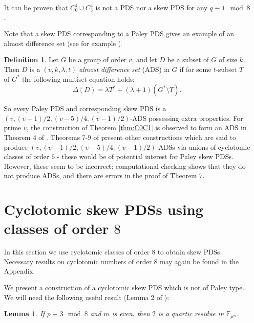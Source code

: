 \documentclass[12pt, a4paper]{article}
\newtheorem{lemma}[theorem]{Lemma}
\theoremstyle{definition}
\newtheorem{definition}[theorem]{Definition}
\begin{document}
It can be proven that $C_0^4 \cup C_3^4$ is not a PDS nor a skew PDS for any $q \equiv 1 \mod 8$.

Note that a skew PDS corresponding to a Paley PDS gives an example of an almost difference set (see for example \cite{Ara}).
\begin{definition}
Let $G$ be a group of order $v$, and let $D$ be a subset of $G$ of size $k$. Then $D$ is a $(v,k,\lambda,t)$ \emph{almost difference set} (ADS) in $G$ if for some $t$-subset $T$ of $G^*$ the following multiset equation holds:
$$\Delta(D)=\lambda T^* + (\lambda+1) (G^* \setminus T).$$
\end{definition}

So every Paley PDS and corresponding skew PDS is a $(v,(v-1)/2, (v-5)/4,(v-1)/2)$-ADS possessing extra properties.  For prime $v$, the construction of Theorem \ref{thm:C0C1} is observed to form an ADS in Theorem 4 of \cite{DinHelLam}.  Theorems 7-9 of \cite{DinHelLam} present other constructions which are said to produce $(v,(v-1)/2, (v-5)/4,(v-1)/2)$-ADSs via unions of cyclotomic classes of order $6$ - these would be of potential interest for Paley skew PDSs. However, these seem to be incorrect: computational checking shows that they do not produce ADSs, and there are errors in the proof of Theorem 7.


\section{Cyclotomic skew PDSs using classes of order $8$}

In this section we use cyclotomic classes of order $8$ to obtain skew PDSs.  Necessary results on cyclotomic numbers of order $8$ may again be found in the Appendix.

We present a construction of a cyclotomic skew PDS which is not of Paley type. We will need the following useful result (Lemma 2 of \cite{DinPotWan}):
\begin{lemma}\label{lem:DinPotWan}
If $p \equiv 3 \mod 8$ and $m$ is even, then $2$ is a quartic residue in $\mathbb{F}_{p^m}$.
\end{lemma}
\end{document}
